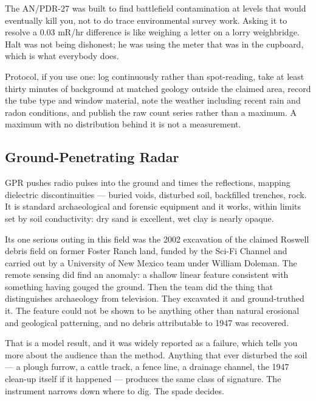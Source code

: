 \begin{funfact}
 The AN/PDR-27 was built to find battlefield
contamination at levels that would eventually kill you, not to do trace environmental survey
work. Asking it to resolve a 0.03 mR/hr difference is like weighing a letter on a lorry
weighbridge. Halt was not being dishonest; he was using the meter that was in the cupboard,
which is what everybody does.
\end{funfact}

Protocol, if you use one: log continuously rather than spot-reading, take at least thirty
minutes of background at matched geology outside the claimed area, record the tube type and
window material, note the weather including recent rain and radon conditions, and publish the
raw count series rather than a maximum. A maximum with no distribution behind it is not a
measurement.

\Needspace*{0.40\textheight}
\subsection{Ground-Penetrating Radar}

GPR pushes radio pulses into the ground and times the reflections, mapping dielectric
discontinuities --- buried voids, disturbed soil, backfilled trenches, rock. It is standard
archaeological and forensic equipment and it works, within limits set by soil conductivity: dry
sand is excellent, wet clay is nearly opaque.

Its one serious outing in this field was the 2002 excavation of the claimed Roswell debris
field on former Foster Ranch land, funded by the Sci-Fi Channel and carried out by a University
of New Mexico team under William Doleman. The remote sensing did find an anomaly: a shallow
linear feature consistent with something having gouged the ground. Then the team did the thing
that distinguishes archaeology from television. They excavated it and ground-truthed it. The
feature could not be shown to be anything other than natural erosional and geological
patterning, and no debris attributable to 1947 was recovered.

That is a model result, and it was widely reported as a failure, which tells you more about the
audience than the method.  Anything that ever disturbed the soil --- a plough furrow, a cattle track, a fence line,
a drainage channel, the 1947 clean-up itself if it happened --- produces the same class of
signature. The instrument narrows down where to dig. The spade decides.


